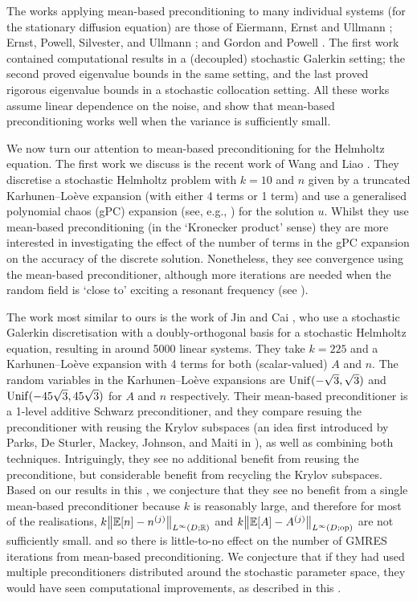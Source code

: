 The works applying mean-based preconditioning to many individual systems (for the stationary diffusion equation) are those of Eiermann, Ernst and Ullmann \cite{EiErUl:07}; Ernst, Powell, Silvester, and Ullmann \cite{ErPoSiUl:09}; and Gordon and Powell \cite{GoPo:12}. The first work contained computational results in a (decoupled) stochastic Galerkin setting; the second proved eigenvalue bounds in the same setting, and the last proved rigorous eigenvalue bounds in a stochastic collocation setting. All these works assume linear dependence on the noise, and show that mean-based preconditioning works well when the variance is sufficiently small.

We now turn our attention to mean-based preconditioning for the Helmholtz equation. The first work we discuss is the recent work of Wang and Liao \cite{WaLi:19}. They discretise a stochastic Helmholtz problem with $k=10$ and $n$ given by a truncated Karhunen--Lo\`eve expansion (with either 4 terms or 1 term) and use a generalised polynomial chaos (gPC) expansion (see, e.g., \cite{XiKa:02}) for the solution $u$. Whilst they use mean-based preconditioning (in the `Kronecker product' sense) they are more interested in investigating the effect of the number of terms in the gPC expansion on the accuracy of the discrete solution. Nonetheless, they see convergence using the mean-based preconditioner, although more iterations are needed when the random field is `close to' exciting a resonant frequency (see \cite[Example 4.2]{WaLi:19}).

The work most similar to ours is the work of Jin and Cai \cite{JiCa:09}, who use a stochastic Galerkin discretisation with a doubly-orthogonal basis for a stochastic Helmholtz equation, resulting in around 5000 linear systems. They take $k = 225$ and a Karhunen--Lo\`eve expansion with 4 terms for both (scalar-valued) $A$ and $n$. The random variables in the Karhunen--Lo\`eve expansions are $\mathrm{Unif}(-\sqrt{3},\sqrt{3})$ and $\mathrm{Unif}(-45\sqrt{3},45\sqrt{3})$ for $A$ and $n$ respectively. Their mean-based preconditioner is a 1-level additive Schwarz preconditioner, and they compare resuing the preconditioner with reusing the Krylov subspaces (an idea first introduced by Parks, De Sturler, Mackey, Johnson, and Maiti in \cite{PadeMaJoMa:06}), as well as combining both techniques. Intriguingly, they see no additional benefit from reusing the preconditione, but considerable benefit from recycling the Krylov subspaces. Based on our results in this , we conjecture that they see no benefit from a single mean-based preconditioner because $k$ is reasonably large, and therefore for most of the realisations, $k\NLiDRR{\EXP{n}-\nsj}$ and $k\NLiDRRdtd{\EXP{A}-\Asj}$ are not sufficiently small. and so there is little-to-no effect on the number of GMRES iterations from mean-based preconditioning. We conjecture that if they had used multiple preconditioners distributed around the stochastic parameter space, they would have seen computational improvements, as described in this .
    
